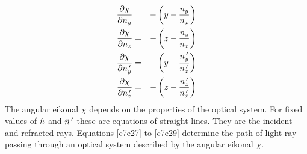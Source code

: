 \begin{enumerate}
\begin{eqnarray}
\frac{\partial{\chi}}{\partial{n_y}} &=& -\left(y - \frac{n_y}{n_x}\right) \label{c7e27} \\
\frac{\partial{\chi}}{\partial{n_z}} &=& -\left(z - \frac{n_z}{n_x}\right) \label{c7e28} \\
\frac{\partial{\chi}}{\partial{n_y^{\,\prime}}} &=& -\left(y-\frac{n_y^{\,\prime}}{n_x^{\,\prime}}\right) \label{c7e28}\\
\frac{\partial{\chi}}{\partial{n_z^{\,\prime}}} &=& -\left(z-\frac{n_z^{\,\prime}}{n_x^{\,\prime}}\right) \label{c7e29}
\end{eqnarray}
The angular eikonal $\chi$ depends on the properties of the optical system. For
fixed values of $\hat{n}$ and $\hat{n}^{\,\prime}$ these are equations of straight lines. They
are the incident and refracted rays. Equations \eqref{c7e27} to \eqref{c7e29}
determine the path of light ray passing through an optical system described by
the angular eikonal $\chi$.
\end{enumerate}

